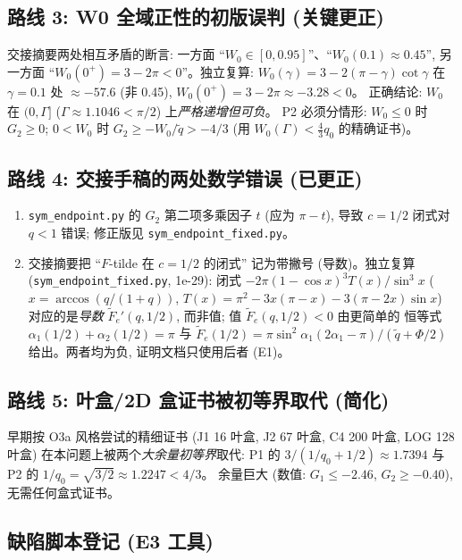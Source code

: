 \documentclass[UTF8]{ctexart}
\begin{document}
\subsection{路线 3: W0 全域正性的初版误判 (关键更正)}

交接摘要两处相互矛盾的断言: 一方面 ``$W_0\in[0,0.95]$''、``$W_0(0.1)\approx0.45$'',
另一方面 ``$W_0(0^+)=3-2\pi<0$''。独立复算: $W_0(\gamma)=3-2(\pi-\gamma)\cot\gamma$
在 $\gamma=0.1$ 处 $\approx-57.6$ (非 0.45), $W_0(0^+)=3-2\pi\approx-3.28<0$。
正确结论: $W_0$ 在 $(0,\Gamma]$ ($\Gamma\approx1.1046<\pi/2$) 上\emph{严格递增但可负}。
P2 必须分情形: $W_0\le0$ 时 $G_2\ge0$; $0<W_0$ 时 $G_2\ge-W_0/\tilde q>-4/3$
(用 $W_0(\Gamma)<\frac43q_0$ 的精确证书)。

\subsection{路线 4: 交接手稿的两处数学错误 (已更正)}

\begin{enumerate}
	\item \texttt{sym\_endpoint.py} 的 $G_2$ 第二项多乘因子 $t$ (应为 $\pi-t$),
		导致 $c=1/2$ 闭式对 $q<1$ 错误; 修正版见
		\texttt{sym\_endpoint\_fixed.py}。
	\item 交接摘要把 ``$F$-tilde 在 $c=1/2$ 的闭式'' 记为带撇号 (导数)。独立复算
		(\texttt{sym\_endpoint\_fixed.py}, 1e-29): 闭式
		$-2\pi(1-\cos x)^3T(x)/\sin^3x$ ($x=\arccos(q/(1+q))$,
		$T(x)=\pi^2-3x(\pi-x)-3(\pi-2x)\sin x$) 对应的是\emph{导数}
		$\widetilde F_e'(q,1/2)$, 而非值; 值 $\widetilde F_e(q,1/2)<0$ 由更简单的
		恒等式 $\alpha_1(1/2)+\alpha_2(1/2)=\pi$ 与
		$\widetilde F_e(1/2)=\pi\sin^2\alpha_1(2\alpha_1-\pi)/(\tilde q+\Phi/2)$
		给出。两者均为负, 证明文档只使用后者 (E1)。
\end{enumerate}

\subsection{路线 5: 叶盒/2D 盒证书被初等界取代 (简化)}

早期按 O3a 风格尝试的精细证书 (J1 16 叶盒, J2 67 叶盒, C4 200 叶盒, LOG 128
叶盒) 在本问题上被两个\emph{大余量初等界}取代: P1 的
$3/(1/q_0+1/2)\approx1.7394$ 与 P2 的 $1/q_0=\sqrt{3/2}\approx1.2247<4/3$。
余量巨大 (数值: $G_1\le-2.46$, $G_2\ge-0.40$), 无需任何盒式证书。

\subsection{缺陷脚本登记 (E3 工具)}
\end{document}
